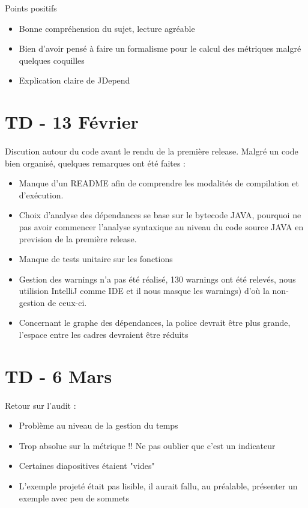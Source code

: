 \documentclass{scrartcl}
\begin{document}
Points positifs
\begin{itemize}
    \item Bonne compréhension du sujet, lecture agréable
    \item Bien d'avoir pensé à faire un formalisme pour le calcul des métriques malgré quelques coquilles
    \item Explication claire de JDepend
\end{itemize}

\section{TD - 13 Février}
\paragraph{}Discution autour du code avant le rendu de la première release.
\newline
Malgré un code bien organisé, quelques remarques ont été faites :
\begin{itemize}
    \item Manque d'un README afin de comprendre les modalités de compilation et d'exécution.
    \item Choix d'analyse des dépendances se base sur le bytecode JAVA, pourquoi ne pas avoir commencer l'analyse syntaxique au niveau du code source JAVA en prevision de la première release.
    \item Manque de tests unitaire sur les fonctions
    \item Gestion des warnings n'a pas été réalisé, 130 warnings ont été relevés, nous utilision IntelliJ comme IDE et il nous masque les warnings) d'où la non-gestion de ceux-ci.
    \item Concernant le graphe des dépendances, la police devrait être plus grande, l'espace entre les cadres devraient être réduits
\end{itemize}
    

\section{TD - 6 Mars}
\paragraph{}Retour sur l'audit :
\begin{itemize}
    \item Problème au niveau de la gestion du temps 
    \item Trop absolue sur la métrique !! Ne pas oublier que c'est un indicateur
    \item Certaines diapositives étaient "vides"
    \item L'exemple projeté était pas lisible, il aurait fallu, au préalable, présenter un exemple avec peu de sommets
\end{itemize}
\end{document}
